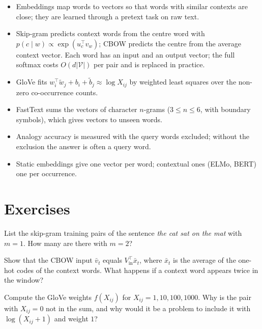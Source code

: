\begin{notechapter}
\begin{chaptersummary}
\begin{itemize}
  \item Embeddings map words to vectors so that words with similar contexts are close; they
        are learned through a pretext task on raw text.
  \item Skip-gram predicts context words from the centre word with $p(c\mid w)\propto\exp(u_c^\top v_w)$; CBOW predicts the
        centre from the average context vector. Each word has an input and an output vector;
        the full softmax costs $O(d|\mathcal V|)$ per pair and is replaced in practice.
  \item GloVe fits $w_i^\top\tilde w_j + b_i + \tilde b_j\approx\log X_{ij}$ by weighted least squares over the non-zero co-occurrence counts.
  \item FastText sums the vectors of character $n$-grams ($3\leq n\leq6$, with boundary symbols), which gives
        vectors to unseen words.
  \item Analogy accuracy is measured with the query words excluded; without the exclusion the
        answer is often a query word.
  \item Static embeddings give one vector per word; contextual ones (ELMo, BERT) one per
        occurrence.
\end{itemize}
\end{chaptersummary}

\section*{Exercises}

\begin{exercise}\label{word-embeddings:exr:1}
List the skip-gram training pairs of the sentence \emph{the cat sat on the mat} with $m = 1$. How many
are there with $m = 2$?
\end{exercise}

\begin{exercise}\label{word-embeddings:exr:2}
Show that the CBOW input $\bar v_t$ equals $V_{\mathrm{in}}^\top\bar x_t$, where $\bar x_t$ is the average of the one-hot codes of the context
words. What happens if a context word appears twice in the window?
\end{exercise}

\begin{exercise}\label{word-embeddings:exr:3}
Compute the GloVe weights $f(X_{ij})$ for $X_{ij} = 1, 10, 100, 1000$. Why is the pair with $X_{ij} = 0$ not in the sum,
and why would it be a problem to include it with $\log(X_{ij} + 1)$ and weight $1$?
\end{exercise}


\end{notechapter}
